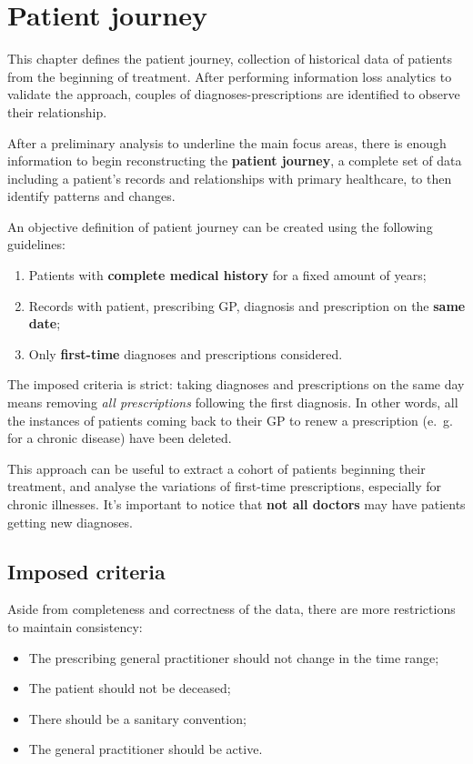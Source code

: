 \chapter{Patient journey}
This chapter defines the patient journey, collection of historical data of patients from the beginning of treatment. After performing information loss analytics to validate the approach, couples of diagnoses-prescriptions are identified to observe their relationship.

After a preliminary analysis to underline the main focus areas, there is enough information to begin reconstructing the \textbf{patient journey}, a complete set of data including a patient's records and relationships with primary healthcare, to then identify patterns and changes. 

An objective definition of patient journey can be created using the following guidelines:
\begin{enumerate}
	\item Patients with \textbf{complete medical history} for a fixed amount of years;
	\item Records with patient, prescribing GP, diagnosis and prescription on the \textbf{same date};
	\item Only \textbf{first-time} diagnoses and prescriptions considered.
\end{enumerate}

The imposed criteria is strict: taking diagnoses and prescriptions on the same day means removing \textit{all prescriptions} following the first diagnosis. In other words, all the instances of patients coming back to their GP to renew a prescription (e.\ g. for a chronic disease) have been deleted.

This approach can be useful to extract a cohort of patients beginning their treatment, and analyse the variations of first-time prescriptions, especially for chronic illnesses. It's important to notice that \textbf{not all doctors} may have patients getting new diagnoses.

\section{Imposed criteria}
Aside from completeness and correctness of the data, there are more restrictions to maintain consistency:
\begin{itemize}
	\item The prescribing general practitioner should not change in the time range;
	\item The patient should not be deceased;
	\item There should be a sanitary convention;
	\item The general practitioner should be active.
\end{itemize}

